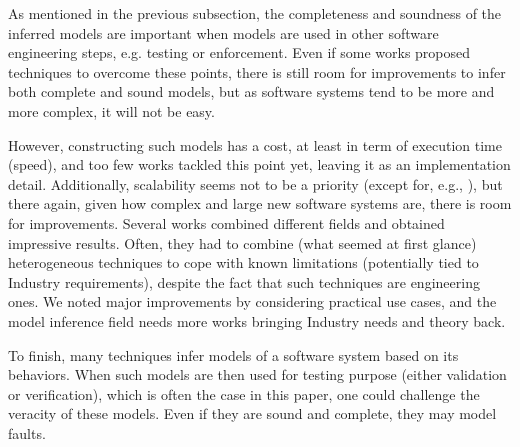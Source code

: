As mentioned in the previous subsection, the completeness and
soundness of the inferred models are important when models are
used in other software engineering steps, e.g. testing or
enforcement. Even if some works
\cite{DBLP:conf/soict/DurandS14,DBLP:conf/fm/DurandS15,DBLP:conf/debs/SalvaD15,tonella2012finding}
proposed techniques to overcome these points, there is still room
for improvements to infer both complete and sound models, but as
software systems tend to be more and more complex, it will not be
easy.

However, constructing such models has a cost, at least in term of
execution time (speed), and too few works tackled this point yet,
leaving it as an implementation detail. Additionally, scalability
seems not to be a priority (except for, e.g.,
\cite{Yang:2006:PMT:1134285.1134325,Pradel:2009,DBLP:conf/debs/SalvaD15}),
but there again, given how complex and large new software systems
are, there is room for improvements. Several works combined
different fields and obtained impressive results. Often, they had
to combine (what seemed at first glance) heterogeneous techniques
to cope with known limitations (potentially tied to Industry
requirements), despite the fact that such techniques are
engineering ones. We noted major improvements by considering
practical use cases, and the model inference field needs more
works bringing Industry needs and theory back.

To finish, many techniques infer models of a software system
based on its behaviors. When such models are then used for
testing purpose (either validation or verification), which is
often the case in this paper, one could challenge the veracity of
these models. Even if they are sound and complete, they may model
faults.
